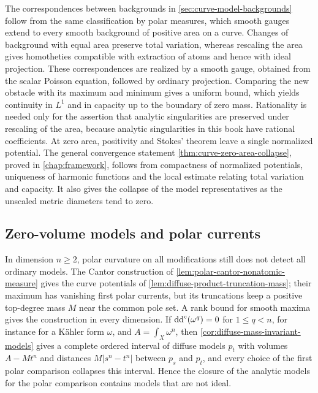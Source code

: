 The correspondences between backgrounds in \cref{sec:curve-model-backgrounds} follow from the same classification by polar measures, which smooth gauges extend to every smooth background of positive area on a curve. Changes of background with equal area preserve total variation, whereas rescaling the area gives homotheties compatible with extraction of atoms and hence with ideal projection. These correspondences are realized by a smooth gauge, obtained from the scalar Poisson equation, followed by ordinary projection. Comparing the new obstacle with its maximum and minimum gives a uniform bound, which yields continuity in $L^1$ and in capacity up to the boundary of zero mass. Rationality is needed only for the assertion that analytic singularities are preserved under rescaling of the area, because analytic singularities in this book have rational coefficients. At zero area, positivity and Stokes' theorem leave a single normalized potential. The general convergence statement \cref{thm:curve-zero-area-collapse}, proved in \cref{chap:framework}, follows from compactness of normalized potentials, uniqueness of harmonic functions and the local estimate relating total variation and capacity. It also gives the collapse of the model representatives as the unscaled metric diameters tend to zero.

\subsection{Zero-volume models and polar currents}

In dimension $n\geq2$, polar curvature on all modifications still does not detect all ordinary models. The Cantor construction of \cref{lem:polar-cantor-nonatomic-measure} gives the curve potentials of \cref{lem:diffuse-product-truncation-mass}; their maximum has vanishing first polar currents, but its truncations keep a positive top-degree mass $M$ near the common pole set. A rank bound for smooth maxima gives the construction in every dimension. If $\mathrm{dd}^{\mathrm{c}}(\omega^q)=0$ for $1\leq q<n$, for instance for a K\"ahler form $\omega$, and $A=\int_X\omega^n$, then \cref{cor:diffuse-mass-invariant-models} gives a complete ordered interval of diffuse models $p_t$ with volumes $A-Mt^n$ and distances $M|s^n-t^n|$ between $p_s$ and $p_t$, and every choice of the first polar comparison collapses this interval. Hence the closure of the analytic models for the polar comparison contains models that are not ideal.

